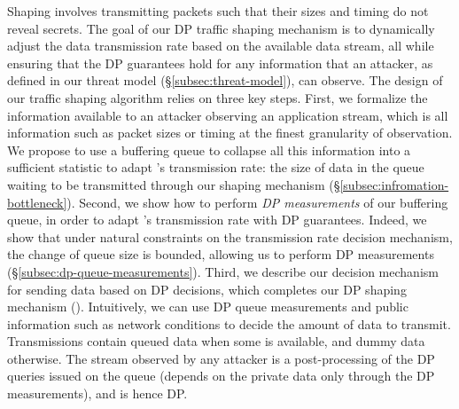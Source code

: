 Shaping involves transmitting packets such that their sizes and timing do not reveal secrets.
The goal of our DP traffic shaping mechanism is to dynamically adjust the data transmission rate based on the available data stream, all while ensuring that the DP guarantees hold for any information that an attacker, as defined in our threat model (\S\ref{subsec:threat-model}), can observe.
The design of our traffic shaping algorithm relies on three key steps.
%
First, we formalize the information available to an attacker observing an application stream, which is all information such as packet sizes or timing at the finest granularity of observation.
We propose to use a buffering queue to collapse all this information into a sufficient statistic to adapt {\sys}'s transmission rate: the size of data in the queue waiting to be transmitted through our shaping mechanism (\S\ref{subsec:infromation-bottleneck}).
%
Second, we show how to perform {\em DP measurements} of our buffering queue, in order to adapt \sys's transmission rate with DP guarantees.
Indeed, we show that under natural constraints on the transmission rate decision mechanism, the change of queue size is bounded, allowing us to perform DP measurements (\S\ref{subsec:dp-queue-measurements}).
%
Third, we describe our decision mechanism for sending data based on DP decisions, which completes our DP shaping mechanism ().
Intuitively, we can use DP queue measurements and public information such as network conditions to decide the amount of data to transmit.
Transmissions contain queued data when some is available, and dummy data otherwise.
The stream observed by any attacker is a post-processing of the DP queries issued on the queue (depends on the private data only through the DP measurements), and is hence DP.




